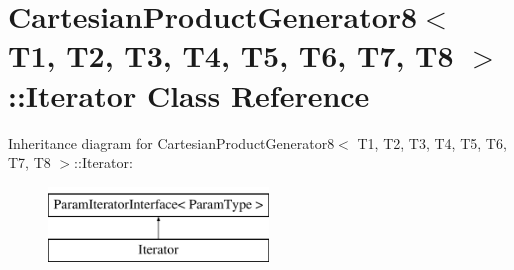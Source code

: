 \hypertarget{classtesting_1_1internal_1_1CartesianProductGenerator8_1_1Iterator}{\section{\-Cartesian\-Product\-Generator8$<$ \-T1, \-T2, \-T3, \-T4, \-T5, \-T6, \-T7, \-T8 $>$\-:\-:\-Iterator \-Class \-Reference}
\label{d8/d35/classtesting_1_1internal_1_1CartesianProductGenerator8_1_1Iterator}
}
\-Inheritance diagram for \-Cartesian\-Product\-Generator8$<$ \-T1, \-T2, \-T3, \-T4, \-T5, \-T6, \-T7, \-T8 $>$\-:\-:\-Iterator\-:\begin{figure}[H]
\begin{center}
\leavevmode
\includegraphics[height=2.000000cm]{d8/d35/classtesting_1_1internal_1_1CartesianProductGenerator8_1_1Iterator}
\end{center}
\end{figure}
